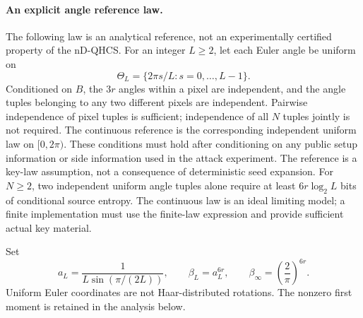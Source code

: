 {\paragraph{An explicit angle reference law.}
The following law is an analytical reference, not an experimentally
certified property of the nD-QHCS. For an integer $L\geq2$, let each
Euler angle be uniform on
\begin{equation}
 \Theta_L=\{2\pi s/L:s=0,\ldots,L-1\}.
\end{equation}
Conditioned on $B$, the $3r$ angles within a pixel are independent,
and the angle tuples belonging to any two different pixels are
independent. Pairwise independence of pixel tuples is sufficient;
independence of all $N$ tuples jointly is not required. The continuous
reference is the corresponding independent uniform law on $[0,2\pi)$.
These conditions must hold after conditioning on any public setup
information or side information used in the attack experiment.
The reference is a key-law assumption, not a consequence of deterministic
seed expansion. For $N\geq2$, two independent uniform angle tuples alone
require at least $6r\log_2L$ bits of conditional source entropy. The
continuous law is an ideal limiting model; a finite implementation must
use the finite-law expression and provide sufficient actual key material.

Set
\begin{equation}
\label{eq:qef_beta_definition}
 a_L=\frac{1}{L\sin(\pi/(2L))},\qquad
 \beta_L=a_L^{6r},\qquad
 \beta_{\infty}=\left(\frac{2}{\pi}\right)^{6r}.
\end{equation}
Uniform Euler coordinates are not Haar-distributed rotations. The
nonzero first moment is retained in the analysis below.

}
